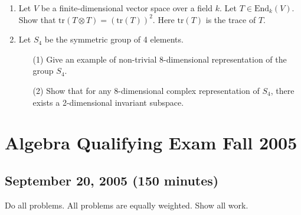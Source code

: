 \documentclass{article}
\begin{document}
\begin{enumerate}
    \item Let \(V\) be a finite-dimensional vector space over a field \(k\). Let \(T \in \text{End}_k(V)\). Show that \(\text{tr}(T \otimes T) = (\text{tr}(T))^2\). Here \(\text{tr}(T)\) is the trace of \(T\).

    \item Let \(S_4\) be the symmetric group of 4 elements.
    \begin{itemize}
        \item[(1)] Give an example of non-trivial 8-dimensional representation of the group \(S_4\).
        \item[(2)] Show that for any 8-dimensional complex representation of \(S_4\), there exists a 2-dimensional invariant subspace.
    \end{itemize}
\end{enumerate}

\section*{Algebra Qualifying Exam Fall 2005}
\subsection*{September 20, 2005 (150 minutes)}

Do all problems. All problems are equally weighted. Show all work.
\end{document}
